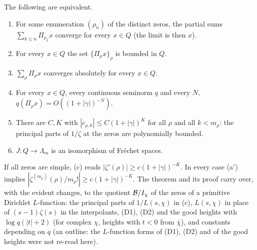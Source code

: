 \begin{theorem}\label{thm:primary}
The following are equivalent.
\begin{enumerate}[label=(\alph*)]
\item For some enumeration $(\rho_n)$ of the distinct zeros, the partial sums $\sum_{k\le n}\Pi_{\rho_k}x$ converge for every $x\in Q$ (the limit is then $x$).
\item[\textit{(a$'$)}] For every $x\in Q$ the set $\{\Pi_\rho x\}_\rho$ is bounded in $Q$.
\item $\sum_\rho\Pi_\rho x$ converges absolutely for every $x\in Q$.
\item[\textit{(b$'$)}] For every $x\in Q$, every continuous seminorm $q$ and every $N$, $q(\Pi_\rho x)=O((1+|\gamma|)^{-N})$.
\item There are $C,K$ with $|c_{\rho,k}|\le C(1+|\gamma|)^K$ for all $\rho$ and all $k<m_\rho$: the principal parts of $1/\zeta$ at the zeros are polynomially bounded.
\item $J:Q\to\Lambda_m$ is an isomorphism of Fréchet spaces.
\end{enumerate}
If all zeros are simple, (c) reads $|\zeta'(\rho)|\ge c(1+|\gamma|)^{-K}$.
In every case (a$'$) implies $|\zeta^{(m_\rho)}(\rho)/m_\rho!|\ge c(1+|\gamma|)^{-K}$. The theorem and its proof carry over, with the evident changes, to the quotient $\mathcal{B}/I_\chi$ of the zeros of a primitive Dirichlet $L$-function: the principal parts of $1/L(s,\chi)$ in (c), $L(s,\chi)$ in place of $(s-1)\zeta(s)$ in the interpolants, (D1), (D2) and the good heights with $\log q(|t|+2)$ (for complex $\chi$, heights with $t<0$ from $\bar\chi$), and constants depending on $q$ (an outline: the $L$-function forms of (D1), (D2) and of the good heights were not re-read here).
\end{theorem}

